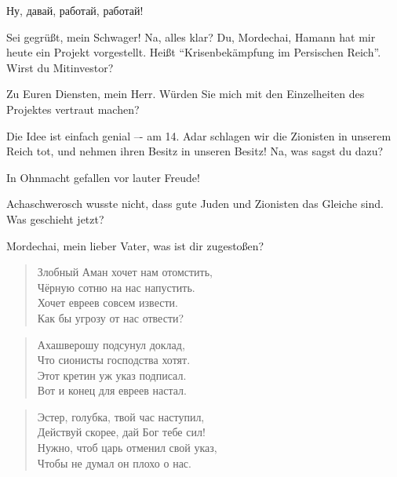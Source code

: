 \documentclass[12pt,a4paper,titlepage]{article}
\begin{document}
\begin{drama}
\ahspeaks {}
Ну, давай, работай, работай!


\scene


\ahspeaks {}
Sei gegrüßt, mein Schwager! Na, alles klar? Du, Mordechai,
Hamann hat mir heute ein Projekt vorgestellt. Heißt
"`Krisenbekämpfung im Persischen Reich"'. Wirst du Mitinvestor?

\mspeaks
Zu Euren Diensten, mein Herr. Würden Sie mich mit den Einzelheiten
des Projektes vertraut machen?

\ahspeaks
Die Idee ist einfach genial –- am 14. Adar schlagen wir die Zionisten
in unserem Reich tot, und nehmen ihren Besitz in unseren Besitz! Na, was sagst du dazu?


\ahspeaks
In Ohnmacht gefallen vor lauter Freude!

\uespeaks
Achaschwerosch wusste nicht, dass gute Juden und Zionisten
das Gleiche sind. Was geschieht jetzt?


\scene


\espeaks
Mordechai, mein lieber Vater, was ist dir zugestoßen?

\mspeaks {}
\begin{verse}
Злобный Аман хочет нам отомстить,\\
Чёрную сотню на нас напустить.\\
Хочет евреев совсем извести.\\
Как бы угрозу от нас отвести?\\
\end{verse}

\begin{verse}
Ахашверошу подсунул доклад,\\
Что сионисты господства хотят.\\
Этот кретин уж указ подписал.\\
Вот и конец для евреев настал.\\
\end{verse}

\begin{verse}
Эстер, голубка, твой час наступил,\\
Действуй скорее, дай Бог тебе сил!\\
Нужно, чтоб царь отменил свой указ,\\
Чтобы не думал он плохо о нас.\\
\end{verse}
              


\end{drama}
\end{document}
